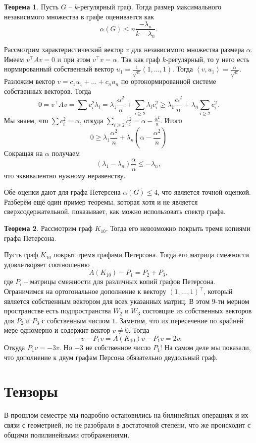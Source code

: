 \documentclass[10pt,a4paper,oneside]{book}
\theoremstyle{definition}
\newtheorem{thm}{{\color{red!40!black} Теорема}}
\def\lan{\left\langle }
\def\ran{\right\rangle}
\def\thrm{\begin{thm}}
\def\ethrm{\end{thm}}
\begin{document}
\thrm Пусть $G$ -- $k$-регулярный граф. Тогда размер максимального независимого множества в графе оценивается как $$\alpha(G)\leq n\frac{-\lambda_n}{k-\lambda_n}.$$
\ethrm
\proof Рассмотрим характеристический вектор $v$ для независимого множества размера $\alpha$. Имеем $v^{\top}Av=0$ и при этом $v^{\top}v=\alpha$. Так как граф $k$-регулярный, то у него есть нормированный собственный вектор $u_1=\frac{1}{\sqrt{n}}(1,\dots,1)$. Тогда $\lan v,u_1\ran = \frac{\alpha}{\sqrt{n}}$. Разложим вектор $v=c_1u_1 + \dots + c_n u_n$ по ортонормированной системе собственных векторов. Тогда
$$0=v^{\top}Av=\sum c_i^2 \lambda_i= \lambda_1\frac{\alpha^2}{n}+ \sum_{i\geq 2} \lambda_i c_i^2\geq \lambda_1\frac{\alpha^2}{n}+ \lambda_n \sum_{i\geq 2} c_i^2.$$
Мы знаем, что $\sum c_i^2=\alpha$, откуда $\sum_{i\geq 2} c_i^2=\alpha - \frac{\alpha^2}{n}$. Итого 
$$0\geq \lambda_1\frac{\alpha^2}{n}+\lambda_n(\alpha- \frac{\alpha^2}{n})$$
Сокращая на $\alpha$ получаем 
$$(\lambda_1-\lambda_n)\frac{\alpha}{n}\leq -\lambda_n,$$
что эквивалентно нужному неравенству.
\endproof

Обе оценки дают для графа Петерсена $\alpha(G)\leq 4$, что является точной оценкой. Разберём ещё один пример теоремы, которая хотя и не является сверхсодержательной, показывает, как можно использовать спектр графа.

\thrm Рассмотрим граф $K_{10}$. Тогда его невозможно покрыть тремя копиями графа Петерсона.
\ethrm
\proof Пусть граф $K_{10}$ покрыт тремя графами Петерсона. Тогда его матрица смежности удовлетворяет соотношению 
$$A(K_{10})-P_1=P_2+P_3,$$
где $P_i$ -- матрицы смежности для различных копий графов Петерсона. Ограничимся на ортогональное дополнение к вектору $(1,\dots,1)^{\top}$, который является собственным вектором для всех указанных матриц. В этом 9-ти мерном пространстве есть подпространства $W_2$ и $W_3$ состоящие из собственных векторов для $P_2$ и $P_3$ с собственным числом $1$. Заметим, что их пересечение по крайней мере одномерно и содержит вектор $v\neq 0$. Тогда $$-v-P_1v=A(K_{10})v-P_1v=2v.$$
Откуда $P_1v=-3v$. Но $-3$ не собственное число $P_1$! На самом деле мы показали, что дополнение к двум графам Персона обязательно двудольный граф.
\endproof


\section{Тензоры}

В прошлом семестре мы подробно остановились на билинейных операциях и их связи с геометрией, но не разобрали в достаточной степени, что же происходит с общими полилинейными отображениями.
\end{document}
